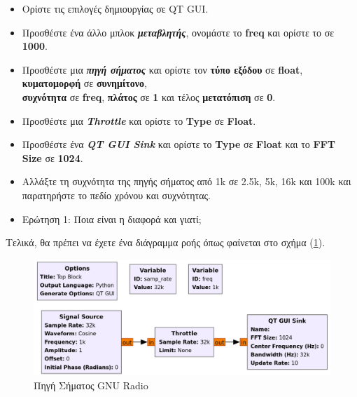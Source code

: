 \documentclass[12pt]{report}
\begin{document}
\begin{itemize}
\begin{itemize}
{                        })
                    \end{itemize}
                \item Ορίστε τις επιλογές δημιουργίας σε QT GUI.
                \item Προσθέστε ένα άλλο μπλοκ \textbf{\textit{μεταβλητής}}, 
                    ονομάστε το \textbf{freq} και ορίστε το σε \textbf{1000}.
                \item Προσθέστε μια \textbf{\textit{πηγή σήματος}} και ορίστε τον \textbf{τύπο εξόδου}
                σε \textbf{float}, \textbf{κυματομορφή} σε \textbf{συνημίτονο},\\
                \textbf{συχνότητα} σε \textbf{freq}, \textbf{πλάτος} σε \textbf{1} και τέλος 
                \textbf{μετατόπιση} σε \textbf{0}.
                \item Προσθέστε μια \textbf{\textit{Throttle}} και ορίστε το \textbf{Type} σε \textbf{Float}.
                \item Προσθέστε ένα \textbf{\textit{QT GUI Sink}} και ορίστε το \textbf{Type} σε \textbf{Float}
                και το \textbf{FFT Size} σε \textbf{1024}.
                \item Αλλάξτε τη συχνότητα της πηγής σήματος από 1k σε 2.5k, 5k, 16k και 100k 
                και παρατηρήστε το πεδίο χρόνου και συχνότητας.
                \item \textsf{Ερώτηση 1: Ποια είναι η διαφορά και γιατί;}
            \end{itemize}

            Τελικά, θα πρέπει να έχετε ένα διάγραμμα ροής όπως φαίνεται στο σχήμα (\ref{fig:grcSource}).
            \begin{figure}[ht]
                \centering
                \includegraphics[width=.8\textwidth]{ex1_flow.png}
                \caption{Πηγή Σήματος GNU Radio}
                \label{fig:grcSource}
            \end{figure}
\end{document}
